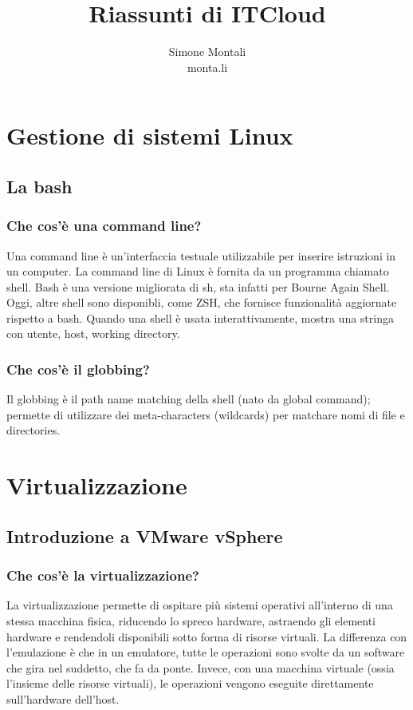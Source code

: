 \documentclass[11pt]{article}
\begin{document}
\author{Simone Montali\\monta.li}
\title{Riassunti di ITCloud}

\maketitle

\medskip
\section{Gestione di sistemi Linux}
\subsection{La bash}
\subsubsection{Che cos'è una command line?}
Una command line è un'interfaccia testuale utilizzabile per inserire istruzioni in un computer. La command line di Linux è fornita da un programma chiamato shell. Bash è una versione migliorata di sh, sta infatti per Bourne Again Shell. Oggi, altre shell sono disponibli, come ZSH, che fornisce funzionalità aggiornate rispetto a bash. Quando una shell è usata interattivamente, mostra una stringa con utente, host, working directory. 

\subsubsection{Che cos'è il globbing?}
Il globbing è il path name matching della shell (nato da global command); permette di utilizzare dei meta-characters (wildcards) per matchare nomi di file e directories.


\section{Virtualizzazione}
\subsection{Introduzione a VMware vSphere}
\subsubsection{Che cos'è la virtualizzazione?}
La virtualizzazione permette di ospitare più sistemi operativi all'interno di una stessa macchina fisica, riducendo lo spreco hardware, astraendo gli elementi hardware e rendendoli disponibili sotto forma di risorse virtuali. La differenza con l'emulazione è che in un emulatore, tutte le operazioni sono svolte da un software che gira nel suddetto, che fa da ponte. Invece, con una macchina virtuale (ossia l'insieme delle risorse virtuali), le operazioni vengono eseguite direttamente sull'hardware dell'host.
\end{document}
